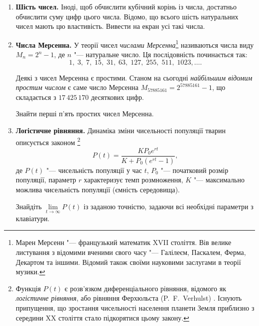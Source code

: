 \begin{enumerate}
\item \textbf{Шість чисел.} Іноді, щоб обчислити кубічний корінь із числа, достатньо обчислити суму цифр цього числа. Відомо, що всього шість натуральних чисел мають цю властивість. Вивести на екран усі такі числа.
\item \textbf{Числа Мерсенна.} У теорії чисел {\itshape числами Мерсенна}\footnote[1]{Марен Мерсенн "--- французький математик XVII століття. Вів велике листування з відомими вченими свого часу "--- Галілеєм, Паскалем, Ферма, Декартом та іншими. Відомий також своїми науковими заслугами в теорії музики.} називаються числа виду $M_n=2^n-1$, де $n$ "--- натуральне число. Ця послідовність починається так:
$$
1,\; 3,\; 7,\; 15,\; 31,\; 63,\; 127,\; 255,\; 511,\; 1023,\ldots.
$$

Деякі з чисел Мерсенна є простими. Станом на сьогодні {\itshape найбільшим відомим простим числом} є саме число Мерсенна
$M_{57885161}=2^{57885161}-1$, що складається з $17\,425\,170$ десяткових цифр.

Знайти перші п'ять простих чисел Мерсенна.
 

\item \textbf{Логістичне рівняння.} Динаміка зміни чисельності популяції тварин описується законом \footnote[1]{Функція $P(t)$ є розв'язком диференціального рівняння, відомого як {\itshape логістичне рівняння}, або рівняння Ферхюльста (P.~F.~Verhulst) . Існують припущення, що зростання чисельності населення планети Земля приблизно з середини XX століття стало підкорятися цьому закону.}
$$
P(t)=\frac{KP_0e^{rt}}{K+P_0(e^{rt}-1)},
$$
де $P(t)$ "--- чисельність популяції у час $t$, $P_0$ "--- початковий розмір популяції, параметр $r$ характеризує темп розмноження, $K$ "--- максимально можлива чисельність популяції (ємність середовища).

Знайдіть $\lim\limits_{t\to\infty}P(t)$ із заданою точністю, задаючи всі необхідні параметри з клавіатури.
\end{enumerate}




